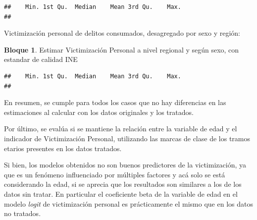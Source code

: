 \documentclass[]{book}
\newenvironment{Shaded}{\begin{snugshade}}{\end{snugshade}}
\newcommand{\DataTypeTok}[1]{\textcolor[rgb]{0.13,0.29,0.53}{#1}}
\newcommand{\KeywordTok}[1]{\textcolor[rgb]{0.13,0.29,0.53}{\textbf{#1}}}
\newcommand{\NormalTok}[1]{#1}
\newcommand{\OperatorTok}[1]{\textcolor[rgb]{0.81,0.36,0.00}{\textbf{#1}}}
\newcommand{\StringTok}[1]{\textcolor[rgb]{0.31,0.60,0.02}{#1}}
\theoremstyle{definition}
\theoremstyle{definition}
\newtheorem{example}{Bloque}[chapter]
\theoremstyle{definition}
\theoremstyle{definition}
\theoremstyle{remark}
\begin{document}
\begin{verbatim}
##    Min. 1st Qu.  Median    Mean 3rd Qu.    Max. 
## 
\end{verbatim}

Victimización personal de delitos consumados, desagregado por sexo y región:

\begin{example}
\protect\hypertarget{exm:bloque79nbm}{}{\label{exm:bloque79nbm} }Estimar Victimización Personal a nivel regional y según sexo, con estandar de calidad INE
\end{example}

\begin{Shaded}
\end{Shaded}

\begin{verbatim}
##    Min. 1st Qu.  Median    Mean 3rd Qu.    Max. 
## 
\end{verbatim}

En resumen, se cumple para todos los casos que no hay diferencias en las estimaciones al calcular con los datos originales y los tratados.

Por último, se evalúa si se mantiene la relación entre la variable de edad y el indicador de Victimización Personal, utilizando las marcas de clase de los tramos etarios presentes en los datos tratados.

Si bien, los modelos obtenidos no son buenos predictores de la victimización, ya que es un fenómeno influenciado por múltiples factores y acá solo se está considerando la edad, si se aprecia que los resultados son similares a los de los datos sin tratar. En particular el coeficiente beta de la variable de edad en el modelo \emph{logit} de victimización personal es prácticamente el mismo que en los datos no tratados.
\end{document}
